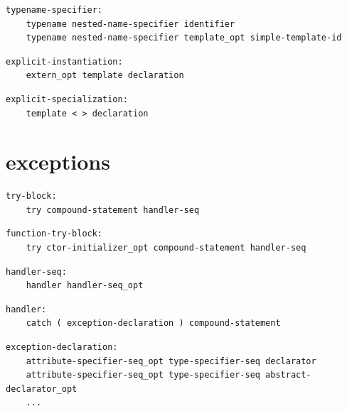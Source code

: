 \noindent\textbf{\texttt{}}\par
\begin{lstlisting}
typename-specifier:
    typename nested-name-specifier identifier
    typename nested-name-specifier template_opt simple-template-id
\end{lstlisting}

\noindent\textbf{\texttt{}}\par
\begin{lstlisting}
explicit-instantiation:
    extern_opt template declaration
\end{lstlisting}

\noindent\textbf{\texttt{}}\par
\begin{lstlisting}
explicit-specialization:
    template < > declaration
\end{lstlisting}

\section{exceptions}

\noindent\textbf{\texttt{}}\par
\begin{lstlisting}
try-block:
    try compound-statement handler-seq
\end{lstlisting}

\noindent\textbf{\texttt{}}\par
\begin{lstlisting}
function-try-block:
    try ctor-initializer_opt compound-statement handler-seq
\end{lstlisting}

\noindent\textbf{\texttt{}}\par
\begin{lstlisting}
handler-seq:
    handler handler-seq_opt
\end{lstlisting}

\noindent\textbf{\texttt{}}\par
\begin{lstlisting}
handler:
    catch ( exception-declaration ) compound-statement
\end{lstlisting}

\noindent\textbf{\texttt{}}\par
\begin{lstlisting}
exception-declaration:
    attribute-specifier-seq_opt type-specifier-seq declarator
    attribute-specifier-seq_opt type-specifier-seq abstract-declarator_opt
    ...
\end{lstlisting}

